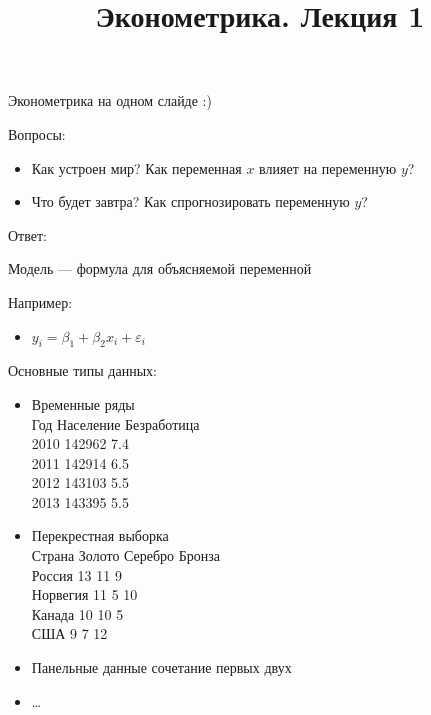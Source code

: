 \documentclass[ignorenonframetext,]{beamer}
\title{Эконометрика. Лекция 1}
\begin{document}
\frame{\titlepage}

\begin{frame}{Эконометрика на одном слайде :)}

\begin{block}{Вопросы:}

\begin{itemize}
\itemsep1pt\parskip0pt
\item
  Как устроен мир? Как переменная $x$ влияет на переменную $y$?
\item
  Что будет завтра? Как спрогнозировать переменную $y$?
\end{itemize}

\end{block}

\begin{block}{Ответ:}

Модель --- формула для объясняемой переменной

\end{block}

\begin{block}{Например:}

\begin{itemize}
\itemsep1pt\parskip0pt
\item
  $y_i=\beta_1+\beta_2 x_i + \varepsilon_i$ 
\end{itemize}

\end{block}

\end{frame}

\begin{frame}{Основные типы данных:}

\begin{itemize}
\item
  Временные ряды\\Год Население Безработица\\2010 142962 7.4\\2011
  142914 6.5\\2012 143103 5.5\\2013 143395 5.5
\item
  Перекрестная выборка\\Страна Золото Серебро Бронза\\Россия 13 11
  9\\Норвегия 11 5 10\\Канада 10 10 5\\США 9 7 12
\item
  Панельные данные сочетание первых двух
\item
  \ldots{}
\end{itemize}

\end{frame}
\end{document}
